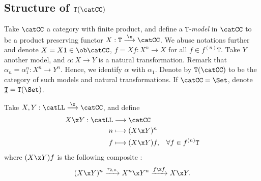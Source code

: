 \documentclass[a4paper, 12pt]{article}
\newcommand{\theory}{\mathtt}
\begin{document}
\subsection{Structure of $\theory{T} ( \catCC )$}

Take $\catCC$ a category with finite product, and define a \emph{$\theory{T}$-model} in $\catCC$ to be a product preserving functor $X : \theory{T} \stackrel{\x}{\longrightarrow} \catCC$. We abuse notations further and denote $X = X1 \in \ob \catCC$, $f = Xf : X^n \longrightarrow X$ for all $f \in f^{(n)} \theory{T}$. Take $Y$ another model, and $\alpha : X \longrightarrow Y$ is a natural transformation. Remark that $\alpha_n = \alpha_1^n : X^n \longrightarrow Y^n$. Hence, we identify $\alpha$ with $\alpha_1$. Denote by $\theory{T} (\catCC)$ to be the category of such models and natural transformations. If $\catCC = \Set$, denote $\underline{\theory{T}} = \theory{T} (\Set)$.

Take $X, Y : \catLL \stackrel{\x}{\longrightarrow} \catCC$, and define
\begin{align*}
	X \x Y : \catLL &\longrightarrow \catCC \\
	n &\longmapsto (X \x Y)^n \\
	f &\longmapsto (X \x Y) f, & \forall f \in f^{(n)} \theory{T}
\end{align*}
where $(X \x Y) f$ is the following composite :
\[ (X \x Y)^n \xrightarrow{\tau_{2, n}} X^n \x Y^n
              \xrightarrow{f \x f} X \x Y . \]
\end{document}
